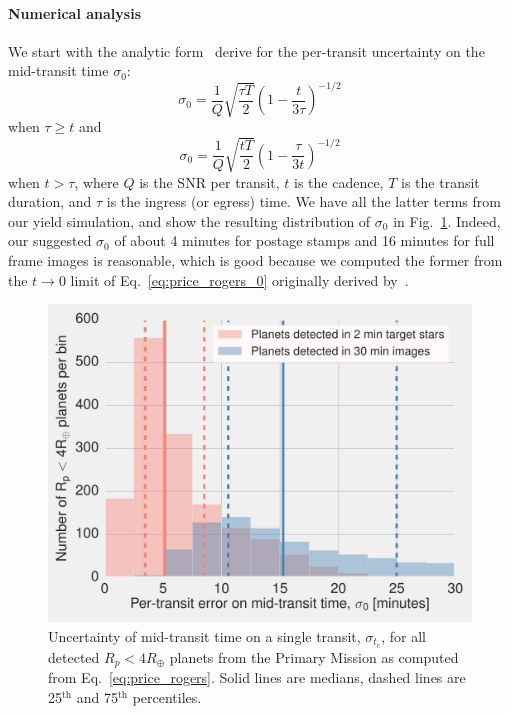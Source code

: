 \paragraph{Numerical analysis}
We start with the analytic form~\citet{price_transit_2014} derive for the per-transit uncertainty on the mid-transit time $\sigma_0$:
\begin{equation}
\sigma_{0} = \frac{1}{Q} \sqrt{ \frac{\tau T}{2} } \left( 1 - \frac{t}{3\tau} 
\right)^{-1/2}
	\label{eq:price_rogers_0}
\end{equation}
when $\tau\geq t$ and 
\begin{equation}
	\sigma_{0} = \frac{1}{Q} \sqrt{\frac{t T }{2}} \left( 1 - \frac{\tau}{3t} \right)^{-1/2}
	\label{eq:price_rogers}
\end{equation}
when $t > \tau$,
where $Q$ is the SNR per transit, $t$ is the cadence, $T$ is the transit duration, and $\tau$ is the ingress (or egress) time.
We have all the latter terms from our yield simulation, and show the resulting 
distribution of $\sigma_0$ in Fig.~\ref{fig:uncertainty_tc_hist}.
Indeed, our suggested $\sigma_0$ of about 4 minutes for postage stamps and 16 
minutes for full frame images is reasonable, which is good because we computed 
the former from the $t\rightarrow0$ limit of Eq.~\ref{eq:price_rogers_0} 
originally derived by~\citet{carter_analytic_2008}.
\begin{figure}[!t]
	\centering
	\includegraphics[scale=1.]{figures/mid_transit_time_vs_cadence.pdf}
	\caption{Uncertainty of mid-transit time on a single transit, $\sigma_{t_c}$, for all detected $R_p<4R_\oplus$ planets from the Primary Mission as computed from Eq.~\protect\ref{eq:price_rogers}.
		Solid lines are medians, dashed lines are 25$^\mathrm{th}$ and 75$^\mathrm{th}$ percentiles.
	}
	\label{fig:uncertainty_tc_hist}
\end{figure}

